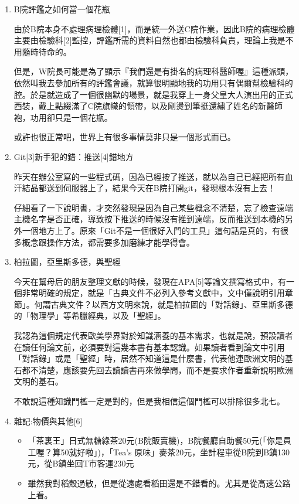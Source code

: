 \documentclass[
]{article}
\providecommand{\tightlist}{%
  \setlength{\itemsep}{0pt}\setlength{\parskip}{0pt}}
\begin{document}
\begin{enumerate}
\def\labelenumi{\arabic{enumi}.}
\item
  B院評鑑之如何當一個花瓶

  由於B院本身不處理病理檢體{[}1{]}，而是統一外送C院作業，因此B院的病理檢體主要由檢驗科{[}2{]}監控，評鑑所需的資料自然也都由檢驗科負責，理論上我是不用隨時待命的。

  但是，W院長可能是為了顯示『我們還是有掛名的病理科醫師喔』這種派頭，依然叫我去參加所有的評鑑會議，就算很明顯地我的功用只有偶爾幫檢驗科的腔。於是就造成了一個很幽默的場景，就是我穿上一身父皇大人演出用的正式西裝，戴上點綴滿了C院旗幟的領帶，以及剛燙到筆挺還繡了姓名的新醫師袍，功用卻只是一個花瓶。

  或許也很正常吧，世界上有很多事情莫非只是一個形式而已。
\item
  Git{[}3{]}新手犯的錯：推送{[}4{]}錯地方

  昨天在辦公室寫的一些程式碼，因為已經按了推送，就以為自己已經把所有血汗結晶都送到伺服器上了，結果今天在B院打開git，發現根本沒有上去！

  仔細看了一下說明書，才突然發現是因為自己某些概念不清楚，忘了檢查遠端主機名字是否正確，導致按下推送的時候沒有推到遠端，反而推送到本機的另外一個地方上了。原來「Git不是一個很好入門的工具」這句話是真的，有很多概念跟操作方法，都需要多加磨練才能學得會。
\item
  柏拉圖，亞里斯多德，與聖經

  今天在幫母后的朋友整理文獻的時候，發現在APA{[}5{]}等論文撰寫格式中，有一個非常明確的規定，就是「古典文件不必列入參考文獻中，文中僅說明引用章節」。何謂古典文件？以西方文明來說，就是柏拉圖的「對話錄」、亞里斯多德的「物理學」等希臘經典，以及「聖經」。

  我認為這個規定代表歐美學界對於知識涵養的基本需求，也就是說，預設讀者在讀任何論文前，必須要對這幾本書有基本認識。如果讀者看到論文中引用「對話錄」或是「聖經」時，居然不知道這是什麼書，代表他連歐洲文明的基石都不清楚，應該要先回去讀讀書再來做學問，而不是要求作者重新說明歐洲文明的基石。

  不敢說這種知識門檻一定是對的，但是我相信這個門檻可以排除很多北七。
\item
  雜記:物價與其他{[}6{]}

  \begin{itemize}
  \tightlist
  \item
    「茶裏王」日式無糖綠茶20元(B院販賣機)，B院餐廳自助餐50元(「你是員工喔？算50就好啦」)，「Tea's
    原味」麥茶20元，坐計程車從B院到B鎮130元，從B鎮坐回T市客運230元
  \item
    雖然我對稻殼過敏，但是從遠處看稻田還是不錯看的。尤其是從高速公路上看。
  \end{itemize}
\end{enumerate}
\end{document}
